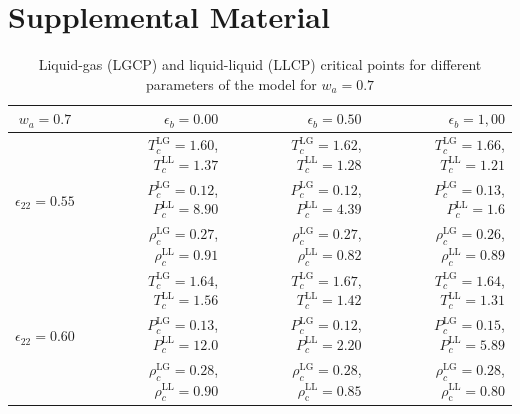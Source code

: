 \documentclass[9pt,twocolumn,twoside,lineno]{pnas-new}
\begin{document}




\showacknow{} %



\section{Supplemental Material}


\begin{table}[h!]
\caption{Liquid-gas (LGCP) and liquid-liquid (LLCP) critical points for different parameters of the model for $w_a=0.7$}
\centering
\begin{tabular}{ |c||r|r|r| } 
 \hline
    $w_a=0.7$ & $\epsilon_b=0.00$ & $\epsilon_b=0.50$ & $\epsilon_b=1,00$ \\ 
  \hline
  \hline
 \multirow{3}{4em}{$\epsilon_{22}=0.55$} &   $T_c^\text{LG}=1.60$,  $T_c^\text{LL}=1.37$  &   $T_c^\text{LG}=1.62$, $T_c^\text{LL}=1.28$  &   $T_c^\text{LG}=1.66$,  $T_c^\text{LL}=1.21$ \\
 &  $P_c^\text{LG}=0.12$, $P_c^\text{LL}=8.90$ & $P_c^\text{LG}=0.12$, $P_c^\text{LL}=4.39$  & $P_c^\text{LG}=0.13$, $P_c^\text{LL}=1.6$ \\
 & $\rho_c^\text{LG}=0.27$, $\rho_c^\text{LL}=0.91$ &  $\rho_c^\text{LG}=0.27$, $\rho_c^\text{LL}=0.82$ &  $\rho_c^\text{LG}=0.26$, $\rho_c^\text{LL}=0.89$ \\ 
 \hline
 
  \multirow{3}{4em}{$\epsilon_{22}=0.60$} &   $T_c^\text{LG}=1.64$, $T_c^\text{LL}=1.56$ &   $T_c^\text{LG}=1.67$, $T_c^\text{LL}=1.42$  &    $T_c^\text{LG}=1.64$, $T_c^\text{LL}=1.31$ \\ 
  & $P_c^\text{LG}=0.13$, $P_c^\text{LL}=12.0$ & $P_c^\text{LG}=0.12$, $P_c^\text{LL}=2.20$& $P_c^\text{LG}=0.15$, $P_c^\text{LL}=5.89$ \\ 
  & $\rho_c^\text{LG}=0.28$, $\rho_c^\text{LL}=0.90$ & $\rho_c^\text{LG}=0.28$, $\rho_\text{c}^\text{LL}=0.85$& $\rho_c^\text{LG}=0.28$, $\rho_\text{c}^\text{LL}=0.80  $ \\ 
 \hline 
 

\end{tabular}
\label{Table3}
\end{table}
\end{document}
